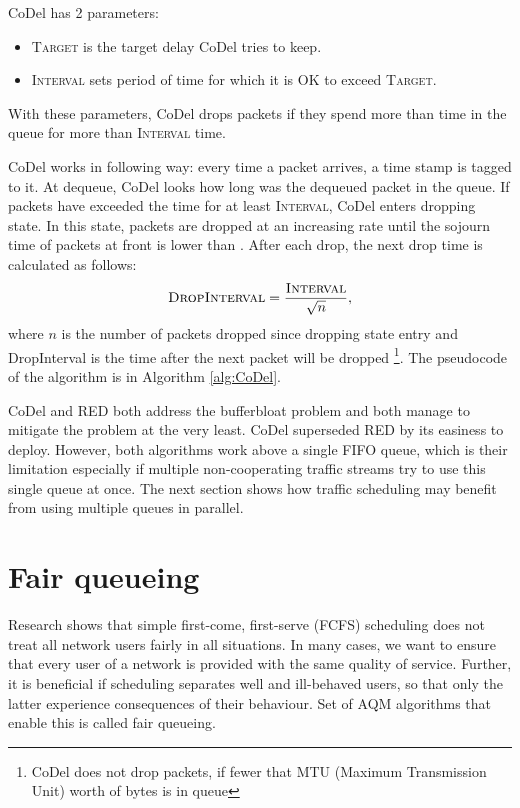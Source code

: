CoDel has 2 parameters:
\begin{itemize}
	\item \textsc{Target} is the target delay CoDel tries to keep.
	\item \textsc{Interval} sets period of time for which it is OK to exceed \textsc{Target}.
\end{itemize}
With these parameters, CoDel drops packets if they spend more than  time in the queue for more than \textsc{Interval} time.

CoDel works in following way: every time a packet arrives, a time stamp is tagged to it. At dequeue, CoDel looks how long was the dequeued packet in the queue. If packets have exceeded the  time for at least \textsc{Interval}, CoDel enters dropping state. In this state, packets are dropped at an increasing rate until the sojourn time of packets at front is lower than . After each drop, the next drop time is calculated as follows:
\[
  \textsc{DropInterval} = \frac{\textsc{Interval}}{\sqrt{n}},
\]
where $n$ is the number of packets dropped since dropping state entry and DropInterval is the time after the next packet will be dropped \footnote{CoDel does not drop packets, if fewer that MTU (Maximum Transmission Unit) worth of bytes is in queue}. The pseudocode of the algorithm is in Algorithm \ref{alg:CoDel}.


 
CoDel and RED both address the bufferbloat problem and both manage to mitigate the problem at the very least. CoDel superseded RED by its easiness to deploy. However, both algorithms work above a single FIFO queue, which is their limitation especially if multiple non-cooperating traffic streams try to use this single queue at once. The next section shows how traffic scheduling may benefit from using multiple queues in parallel.

\section{Fair queueing}
\label{sec:fair_queueing}
Research shows \cite{Nagle:FQ} that simple first-come, first-serve (FCFS) scheduling does not treat all network users fairly in all situations. In many cases, we want to ensure that every user of a network is provided with the same quality of service. Further, it is beneficial if scheduling separates well and ill-behaved users, so that only the latter experience consequences of their behaviour. Set of AQM algorithms that enable this is called fair queueing.


